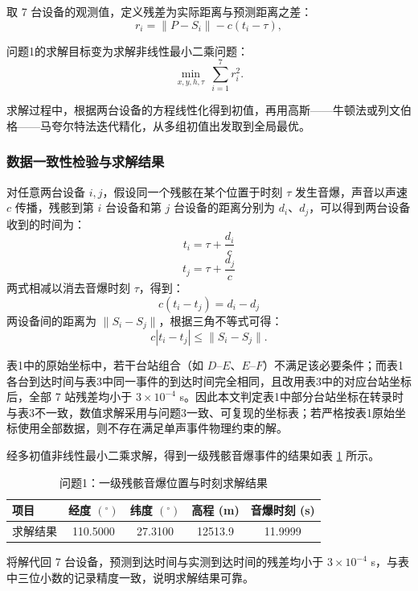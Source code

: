 \documentclass[12pt,a4paper]{article}
\begin{document}
取 7 台设备的观测值，定义残差为实际距离与预测距离之差：
\begin{equation}
  r_i=\|P-S_i\|-c(t_i-\tau),
\end{equation}\label{eq2}

问题1的求解目标变为求解非线性最小二乘问题：
\begin{equation}
  \min_{x,y,h,\tau}\ \sum_{i=1}^{7}r_i^2.
\end{equation}\label{eq3}

求解过程中，根据两台设备的方程线性化得到初值，再用高斯——牛顿法或列文伯格——马夸尔特法迭代精化，从多组初值出发取到全局最优。

\subsubsection{数据一致性检验与求解结果}

对任意两台设备 $i,j$，假设同一个残骸在某个位置于时刻 $\tau$ 发生音爆，声音以声速 $c$ 传播，残骸到第 $i$ 台设备和第 $j$ 台设备的距离分别为 $d_i$、$d_j$，可以得到两台设备收到的时间为：
$$t_i=\tau+\frac{d_i}{c}$$
$$t_j=\tau+\frac{d_j}{c}$$
两式相减以消去音爆时刻 $\tau$，得到：
$$c(t_i-t_j)=d_i-d_j$$
两设备间的距离为 $\|S_i-S_j\|$，根据三角不等式可得：
\begin{equation}
  c|t_i-t_j|\le\|S_i-S_j\|.
\end{equation}

表1中的原始坐标中，若干台站组合（如 $D$--$E$、$E$--$F$）不满足该必要条件；而表1各台到达时间与表3中同一事件的到达时间完全相同，且改用表3中的对应台站坐标后，全部 7 站残差均小于 $3\times10^{-4}$ s。因此本文判定表1中部分台站坐标在转录时与表3不一致，数值求解采用与问题3一致、可复现的坐标表；若严格按表1原始坐标使用全部数据，则不存在满足单声事件物理约束的解。

经多初值非线性最小二乘求解，得到一级残骸音爆事件的结果如表 \ref{tab:q1} 所示。

\begin{table}[H]
\centering
\caption{问题1：一级残骸音爆位置与时刻求解结果}
\label{tab:q1}
\begin{tabular}{lcccc}
\toprule
项目 & 经度 $(^{\circ})$ & 纬度 $(^{\circ})$ & 高程 (m) & 音爆时刻 (s) \\
\midrule
求解结果 & 110.5000 & 27.3100 & 12513.9 & 11.9999 \\
\bottomrule
\end{tabular}
\end{table}

将解代回 7 台设备，预测到达时间与实测到达时间的残差均小于 $3\times10^{-4}$ s，与表中三位小数的记录精度一致，说明求解结果可靠。
\end{document}
